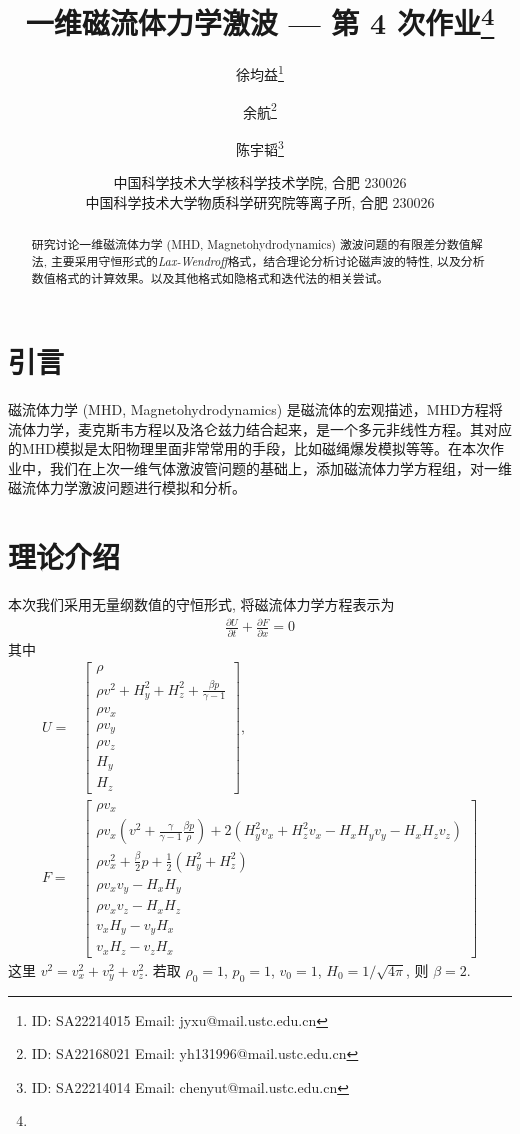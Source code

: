 \documentclass[10.5pt
]{article}
\title{一维磁流体力学激波 --- 第 4 次作业\footnote{\Term\Course}}
\author{徐均益\footnote{ID: SA22214015 Email: jyxu@mail.ustc.edu.cn}
  \and
  余航\footnote{ID: SA22168021 Email: yh131996@mail.ustc.edu.cn}
  \and
  陈宇韬\footnote{ID: SA22214014 Email: chenyut@mail.ustc.edu.cn}
}
\date{%
\scriptsize%
中国科学技术大学核科学技术学院, 合肥 230026 \\
中国科学技术大学物质科学研究院等离子所, 合肥 230026
%
}
\begin{document}
\maketitle

\begin{abstract}
研究讨论一维磁流体力学 (MHD, Magnetohydrodynamics) 激波问题的有限差分数值解法, 主要采用守恒形式的\textit{Lax-Wendroff}格式，结合理论分析讨论磁声波的特性,
以及分析数值格式的计算效果。以及其他格式如隐格式和迭代法的相关尝试。
\end{abstract}

\section{引言}
磁流体力学 (MHD, Magnetohydrodynamics) 是磁流体的宏观描述，MHD方程将流体力学，麦克斯韦方程以及洛仑兹力结合起来，是一个多元非线性方程。其对应的MHD模拟是太阳物理里面非常常用的手段，比如磁绳爆发模拟等等。在本次作业中，我们在上次一维气体激波管问题的基础上，添加磁流体力学方程组，对一维磁流体力学激波问题进行模拟和分析。

\section{理论介绍}\label{DLess}
本次我们采用无量纲数值的守恒形式, 将磁流体力学方程表示为
\begin{align}
\frac{\partial U}{\partial t} + \frac{\partial F}{\partial x} = 0 \label{Eqn:MHD}
\end{align}
其中
\begin{align}
U = & \left[ \begin{array}{l}
\rho\\
\rho v^2 + H_y^2 + H_z^2 + \frac{\beta p}{\gamma -1}
\\
\rho v_x\\
\rho v_y\\
\rho v_z\\
H_y\\
H_z
\end{array} \right]\label{Eqn:Flux_U}, \\
F = & \left[ \begin{array}{l}
\rho v_x\\
\rho v_x \left(v^2 + \frac{\gamma}{\gamma - 1} \frac{\beta p}{\rho} \right) + 2(H_y^2 v_x + H_z^2 v_x - H_x H_y v_y - H_x H_z v_z)
\\
\rho v_x^2 + \frac{\beta}{2} p + \frac{1}{2} (H_y^2 + H_z^2)\\
\rho v_x v_y - H_x H_y\\
\rho v_x v_z - H_x H_z\\
v_x H_y - v_y H_x\\
v_x H_z - v_z H_x
\end{array} \right] \label{Eqn:Flux}
\end{align}
这里 $v^2 = v_x^2 + v_y^2 + v_z^2$. 若取 $\rho_0 = 1$, $p_0 = 1$, $v_0 = 1$, $H_0 = 1/\sqrt{4\pi}$, 则 $\beta = 2$.
\end{document}
